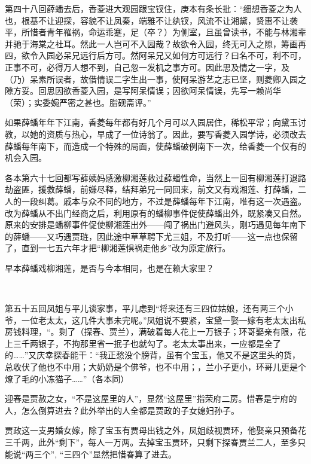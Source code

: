 \par 第四十八回薛蟠去后，香菱进大观园跟宝钗住，庚本有条长批：“细想香菱之为人也，根基不让迎探，容貌不让凤秦，端雅不让纨钗，风流不让湘黛，贤惠不让袭平，所惜者青年罹祸，命运乖蹇，足（卒？）为侧室，且虽曾读书，不能与林湘辈并驰于海棠之社耳。然此一人岂可不入园哉？故欲令入园，终无可入之隙，筹画再四，欲令入园必呆兄远行后方可。然阿呆兄又如何方可远行？曰名不可，利不可，正事不可，必得万人想不到，自己忽一发机之事方可。因此思及情之一字，及（乃）呆素所误者，故借情误二字生出一事，使阿呆游艺之志已坚，则菱卿入园之隙方妥。回思因欲香菱入园，是写阿呆情误；因欲阿呆情误，先写一赖尚华（荣）；实委婉严密之甚也。脂砚斋评。”
\par 如果薛蟠年年下江南，香菱每年都有好几个月可以入园居住，稀松平常；向黛玉讨教，以她的资质与热心，早成了一位诗翁了。因此，要写香菱入园学诗，必须改去薛蟠每年南下，而造成一个特殊的局面，使薛蟠破例南下一次，给香菱一个仅有的机会入园。
\par 各本第六十七回都写薛姨妈感激柳湘莲救过薛蟠性命，当然上一回有柳湘莲打退路劫盗匪，援救薛蟠，前嫌尽释，结拜弟兄一同回来，前文又有戏湘莲、打薛蟠，二人的一段纠葛。戚本与众不同的地方，不过是薛蟠每年下江南，唯有这一次遇盗。改为薛蟠从不出门经商之后，利用原有的蟠柳事件促使薛蟠出外，既紧凑又自然。原来的安排是蟠柳事件促使柳湘莲出外——闯了祸出门避风头，刚巧遇见每年南下的薛蟠——又巧遇贾琏，因此途中草草聘下尤三姐，不及打听——这一点也保留了，直到一七五六年才把“柳湘莲惧祸走他乡”改为原定旅行。
\par 早本薛蟠戏柳湘莲，是否与今本相同，也是在赖大家里？
\par  
\par 第五十五回凤姐与平儿谈家事，平儿虑到“将来还有三四位姑娘，还有两三个小爷，一位老太太，这几件大事未完呢。”凤姐说不要紧，宝黛一娶一嫁有老太太出私房钱料理，“。剩了（探春、贾兰），满破着每人花上一万银子；环哥娶亲有限，花上三千两银子，不拘那里省一抿子也就勾了。老太太事出来，一应都是全了的……”又庆幸探春能干：“我正愁没个膀背，虽有个宝玉，他又不是这里头的货，总收伏了他也不中用；大奶奶是个佛爷，也不中用；，兰小子更小，环哥儿更是个燎了毛的小冻猫子……”（各本同）
\par 迎春是贾赦之女，“不是这屋里的人”，显然“这屋里”指荣府二房。惜春是宁府的人，怎么倒算进去？此外举出的人全都是贾政的子女媳妇孙子。
\par 贾政这一支男婚女嫁，除了宝玉有贾母出钱之外，凤姐歧视贾环，他娶亲只预备花三千两，此外“剩下”，每人一万两。去掉宝玉贾环，只剩下探春贾兰二人，至多只能说“两三个”, “三四个”显然把惜春算了进去。
